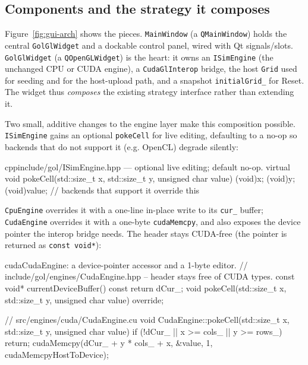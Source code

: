 \documentclass[
	english,
	letterpaper, oneside
]{article}
\begin{document}
\subsection{Components and the strategy it composes}

Figure~\ref{fig:gui-arch} shows the pieces. \texttt{MainWindow} (a
\texttt{QMainWindow}) holds the central \texttt{GolGlWidget} and a dockable control
panel, wired with Qt signals/slots. \texttt{GolGlWidget} (a \texttt{QOpenGLWidget})
is the heart: it owns an \texttt{ISimEngine} (the unchanged CPU or CUDA engine),
a \texttt{CudaGlInterop} bridge, the host \texttt{Grid} used for seeding and for
the host-upload path, and a snapshot \texttt{initialGrid\_} for Reset. The widget
thus \emph{composes} the existing strategy interface rather than extending it.


Two small, additive changes to the engine layer make this composition possible.
\texttt{ISimEngine} gains an optional \texttt{pokeCell} for live editing,
defaulting to a no-op so backends that do not support it (e.g. OpenCL) degrade
silently:

\begin{sourcecode}{cpp}{include/gol/ISimEngine.hpp --- optional live editing; default no-op.}
virtual void pokeCell(std::size_t x, std::size_t y, unsigned char value) {
  (void)x; (void)y; (void)value;   // backends that support it override this
}
\end{sourcecode}

\texttt{CpuEngine} overrides it with a one-line in-place write to its \texttt{cur\_}
buffer; \texttt{CudaEngine} overrides it with a one-byte \texttt{cudaMemcpy}, and
also exposes the device pointer the interop bridge needs. The header stays
CUDA-free (the pointer is returned as \texttt{const void*}):

\begin{sourcecode}{cuda}{CudaEngine: a device-pointer accessor and a 1-byte editor.}
// include/gol/engines/CudaEngine.hpp -- header stays free of CUDA types.
const void* currentDeviceBuffer() const { return dCur_; }
void pokeCell(std::size_t x, std::size_t y, unsigned char value) override;

// src/engines/cuda/CudaEngine.cu
void CudaEngine::pokeCell(std::size_t x, std::size_t y, unsigned char value) {
  if (!dCur_ || x >= cols_ || y >= rows_) return;
  cudaMemcpy(dCur_ + y * cols_ + x, &value, 1, cudaMemcpyHostToDevice);
}
\end{sourcecode}
\end{document}
